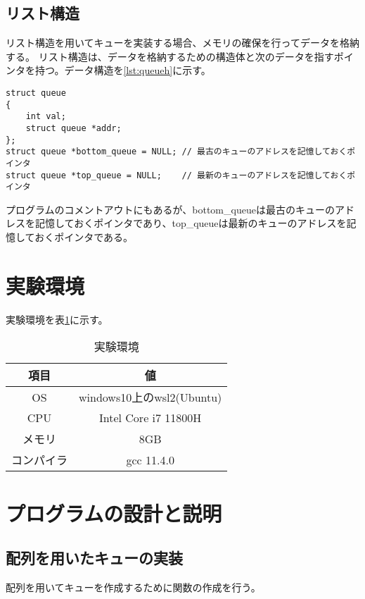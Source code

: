 \documentclass[dvipdfmx]{jsarticle}
\begin{document}
\subsection{リスト構造}
リスト構造を用いてキューを実装する場合、メモリの確保を行ってデータを格納する。
リスト構造は、データを格納するための構造体と次のデータを指すポインタを持つ。データ構造を\ref{lst:queueh}に示す。
\begin{lstlisting}[caption={queue.h}, label={lst:queueh}]
struct queue
{
    int val;
    struct queue *addr;
};
struct queue *bottom_queue = NULL; // 最古のキューのアドレスを記憶しておくポインタ
struct queue *top_queue = NULL;    // 最新のキューのアドレスを記憶しておくポインタ
\end{lstlisting}
プログラムのコメントアウトにもあるが、bottom\_queueは最古のキューのアドレスを記憶しておくポインタであり、top\_queueは最新のキューのアドレスを記憶しておくポインタである。
\section{実験環境}
実験環境を表\ref{tab:environment}に示す。
\begin{table}[ht]
  \centering
  \begin{tabular}{|c|c|}
    \hline
    \textbf{項目} & \textbf{値}              \\
    \hline
    OS          & windows10上のwsl2(Ubuntu) \\
    \hline
    CPU         & Intel Core i7 11800H          \\
    \hline
    メモリ         & 8GB                     \\
    \hline
    コンパイラ       & gcc 11.4.0              \\
    \hline
  \end{tabular}
  \caption{実験環境}
  \label{tab:environment}
\end{table}
\section{プログラムの設計と説明}
\subsection{配列を用いたキューの実装}
配列を用いてキューを作成するために関数の作成を行う。
\end{document}
